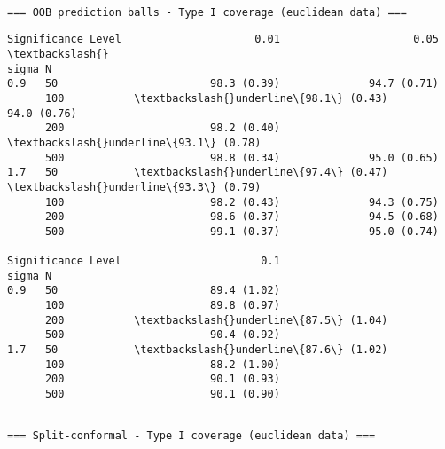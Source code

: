 \documentclass[11pt]{article}
\begin{document}
    \begin{Verbatim}[commandchars=\\\{\}]

=== OOB prediction balls - Type I coverage (euclidean data) ===
    \end{Verbatim}

    
    \begin{Verbatim}[commandchars=\\\{\}]
Significance Level                     0.01                     0.05  \textbackslash{}
sigma N                                                                
0.9   50                        98.3 (0.39)              94.7 (0.71)   
      100           \textbackslash{}underline\{98.1\} (0.43)              94.0 (0.76)   
      200                       98.2 (0.40)  \textbackslash{}underline\{93.1\} (0.78)   
      500                       98.8 (0.34)              95.0 (0.65)   
1.7   50            \textbackslash{}underline\{97.4\} (0.47)  \textbackslash{}underline\{93.3\} (0.79)   
      100                       98.2 (0.43)              94.3 (0.75)   
      200                       98.6 (0.37)              94.5 (0.68)   
      500                       99.1 (0.37)              95.0 (0.74)   

Significance Level                      0.1  
sigma N                                      
0.9   50                        89.4 (1.02)  
      100                       89.8 (0.97)  
      200           \textbackslash{}underline\{87.5\} (1.04)  
      500                       90.4 (0.92)  
1.7   50            \textbackslash{}underline\{87.6\} (1.02)  
      100                       88.2 (1.00)  
      200                       90.1 (0.93)  
      500                       90.1 (0.90)  
    \end{Verbatim}

    
    \begin{Verbatim}[commandchars=\\\{\}]

=== Split-conformal - Type I coverage (euclidean data) ===
    \end{Verbatim}
\end{document}
